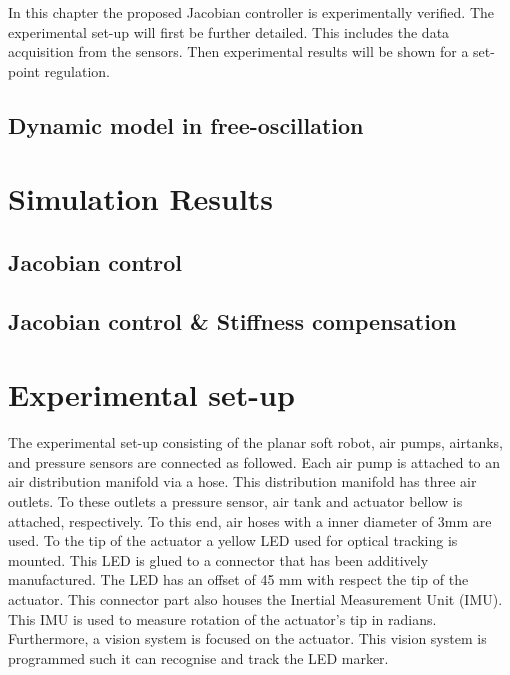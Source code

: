 \label{chap5}

In this chapter the proposed Jacobian controller is experimentally verified. The experimental set-up will first be further detailed. This includes the data acquisition from the sensors. Then experimental results will be shown for a set-point regulation.  




\subsection{Dynamic model in free-oscillation}


\section{Simulation Results}


\subsection{Jacobian control}


\subsection{Jacobian control \& Stiffness compensation}




\section{Experimental set-up}

The experimental set-up consisting of the planar soft robot, air pumps, airtanks, and pressure sensors are connected as followed. Each air pump is attached to an air distribution manifold via a hose. This distribution manifold has three air outlets. To these outlets a pressure sensor, air tank and actuator bellow is attached, respectively. To this end, air hoses with a inner diameter of 3mm are used. To the tip of the actuator a yellow LED used for optical tracking is mounted. This LED is glued to a connector that has been additively manufactured. The LED has an offset of 45 mm with respect the tip of the actuator. This connector part also houses the Inertial Measurement Unit (IMU). This IMU is used to measure  rotation of the actuator's tip in radians. Furthermore, a vision system is focused on the actuator. This vision system is programmed such it can recognise and track the LED marker. 

